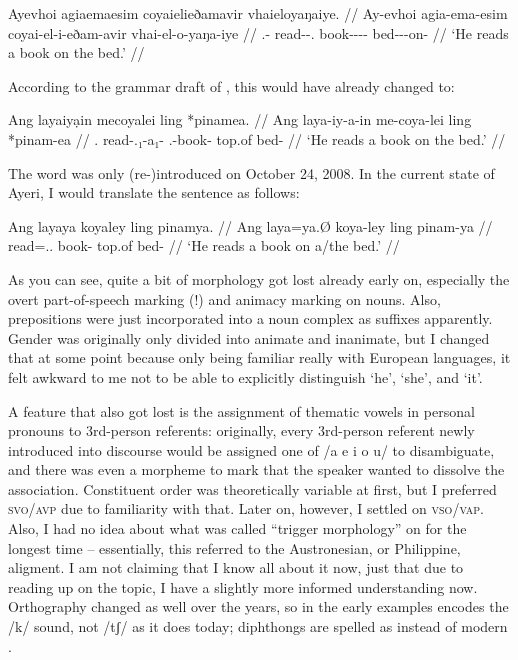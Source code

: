 \ex\begingl
	\gla Ayevhoi agiaemaesim coyaielieðamavir vhaieloyaŋaiye. //
	\glb Ay-evhoi agia-ema-esim coyai-el-i-eðam-avir vhai-el-o-yaŋa-iye //
	\glc \Tsg{}.\An{}-\Sbj{} read-\Vb{}-\Sbj{}.\An{} book-\Nn{}-\An{}-\Indf{}-\Parg{} bed-\Nn{}-\Inan{}-on-\Loc{} //
	\glft `He reads a book on the bed.' //
\endgl\xe

According to the grammar draft of , this would have already 
changed to:

\ex\begingl
	\gla Ang layaiyạin mecoyalei ling *pinamea. //
	\glb Ang laya-iy-a-in me-coya-lei ling *pinam-ea //
	\glc \Aarg{}.\Sbj{} read-\Tsg{}.\An{}₁-a₁-\Sbj{} \Indf{}.\Inan{}-book-\PargI{} top.of bed-\Loc{} //
	\glft `He reads a book on the bed.' //
\endgl\xe

The word  was only (re-)introduced on October 24, 2008. 
In the current state of Ayeri, I would translate the sentence as follows:

\ex\begingl
	\gla Ang layaya koyaley ling pinamya. //
	\glb Ang laya=ya.Ø koya-ley ling pinam-ya //
	\glc \AgtT{} read=\Tsg{}.\M{}.\Top{} book-\PargI{} top.of bed-\Loc{} //
	\glft `He reads a book on a/the bed.' //
\endgl\xe

As you can see, quite a bit of morphology got lost already early on, especially 
the overt part-of-speech marking (!) and animacy marking on nouns. Also, 
prepositions were just incorporated into a noun complex as suffixes apparently. 
Gender was originally only divided into animate and inanimate, but I changed 
that at some point because only being familiar really with European languages, 
it felt awkward to me not to be able to explicitly distinguish `he', `she', and 
`it'.

A feature that also got lost is the assignment of thematic vowels in personal 
pronouns to 3rd-person referents: originally, every 3rd-person referent newly 
introduced into discourse would be assigned one of /a e i o u/ to disambiguate, 
and there was even a morpheme to mark that the speaker wanted to dissolve the 
association. Constituent order was theoretically variable at first, but I 
preferred \textsc{svo/avp} due to familiarity with that. Later on, however, I 
settled on \textsc{vso/vap}. Also, I had no idea about what was called 
``trigger morphology'' on  for the longest time -- essentially, 
this referred to the Austronesian, or Philippine, aligment. I am not claiming 
that I know all about it now, just that due to reading up on the topic, I have 
a slightly more informed understanding now. Orthography changed as well over 
the years, so  in the early examples encodes the /k/ sound, not /tʃ/ as 
it does today; diphthongs are spelled as  instead of modern .

